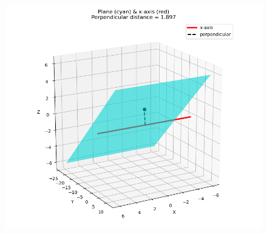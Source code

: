 \documentclass[12pt]{article}
\begin{document}
\begin{figure}[H]
    \centering
    \includegraphics[width=0.9\columnwidth]{figs/plane.png}
    \caption{}
    \label{fig:placeholder}
\end{figure}
\end{document}
